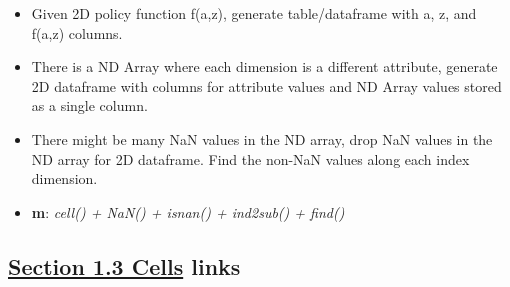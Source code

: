 \documentclass[
]{book}
\providecommand{\tightlist}{%
  \setlength{\itemsep}{0pt}\setlength{\parskip}{0pt}}
\begin{document}
\begin{enumerate}
  \begin{itemize}
  \tightlist
  \item
    Given 2D policy function f(a,z), generate table/dataframe with a, z, and f(a,z) columns.
  \item
    There is a ND Array where each dimension is a different attribute, generate 2D dataframe with columns for attribute values and ND Array values stored as a single column.
  \item
    There might be many NaN values in the ND array, drop NaN values in the ND array for 2D dataframe. Find the non-NaN values along each index dimension.
  \item
    \textbf{m}: \emph{cell() + NaN() + isnan() + ind2sub() + find()}
  \end{itemize}
\end{enumerate}

\hypertarget{section-1.3-cellscells-links}{%
\subsection{\texorpdfstring{\protect\hyperlink{cells}{Section 1.3 Cells} links}{Section 1.3 Cells links}}\label{section-1.3-cellscells-links}}
\end{document}
